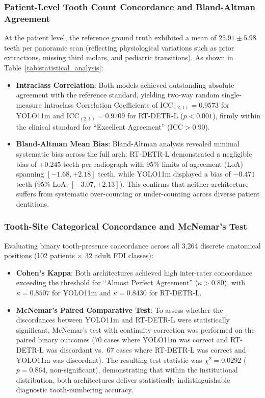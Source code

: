 \documentclass[10pt,journal,compsoc]{IEEEtran}
\begin{document}
\subsubsection{Patient-Level Tooth Count Concordance and Bland-Altman Agreement}
At the patient level, the reference ground truth exhibited a mean of $25.91 \pm 5.98$ teeth per panoramic scan (reflecting physiological variations such as prior extractions, missing third molars, and pediatric transitions). As shown in Table~\ref{tab:statistical_analysis}:
\begin{itemize}
    \item \textbf{Intraclass Correlation}: Both models achieved outstanding absolute agreement with the reference standard, yielding two-way random single-measure Intraclass Correlation Coefficients of $\text{ICC}_{(2,1)} = 0.9573$ for YOLO11m and $\text{ICC}_{(2,1)} = 0.9709$ for RT-DETR-L ($p < 0.001$), firmly within the clinical standard for ``Excellent Agreement'' ($\text{ICC} > 0.90$).
    \item \textbf{Bland-Altman Mean Bias}: Bland-Altman analysis revealed minimal systematic bias across the full arch: RT-DETR-L demonstrated a negligible bias of $+0.245$ teeth per radiograph with 95\% limits of agreement (LoA) spanning $[-1.68, +2.18]$ teeth, while YOLO11m displayed a bias of $-0.471$ teeth (95\% LoA: $[-3.07, +2.13]$). This confirms that neither architecture suffers from systematic over-counting or under-counting across diverse patient dentitions.
\end{itemize}

\subsubsection{Tooth-Site Categorical Concordance and McNemar's Test}
Evaluating binary tooth-presence concordance across all 3,264 discrete anatomical positions (102 patients $\times$ 32 adult FDI classes):
\begin{itemize}
    \item \textbf{Cohen's Kappa}: Both architectures achieved high inter-rater concordance exceeding the threshold for ``Almost Perfect Agreement'' ($\kappa > 0.80$), with $\kappa = 0.8507$ for YOLO11m and $\kappa = 0.8430$ for RT-DETR-L.
    \item \textbf{McNemar's Paired Comparative Test}: To assess whether the discordances between YOLO11m and RT-DETR-L were statistically significant, McNemar's test with continuity correction was performed on the paired binary outcomes (70 cases where YOLO11m was correct and RT-DETR-L was discordant vs.\ 67 cases where RT-DETR-L was correct and YOLO11m was discordant). The resulting test statistic was $\chi^2 = 0.0292$ ($p = 0.864$, non-significant), demonstrating that within the institutional distribution, both architectures deliver statistically indistinguishable diagnostic tooth-numbering accuracy.
\end{itemize}
\end{document}
